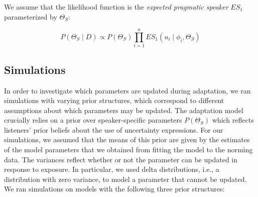 \documentclass[lucida,biblatex]{sp} %
\begin{document}
\noindent We assume that the likelihood function is the \textit{expected pragmatic speaker} $ES_1$ parameterized by $\Theta_S$:

$$P(\Theta_S \mid D) \propto P(\Theta_S)  \prod_{i=1}^n ES_1(u_i \mid \phi_i, \Theta_S) $$



\subsection{Simulations}

In order to investigate which parameters are updated during adaptation, we ran simulations
with varying prior structures, which correspond to different assumptions about which parameters may be updated.
The adaptation model crucially relies on a prior over speaker-specific parameters $P(\Theta_S)$
which reflects listeners' prior beliefs about the use of uncertainty expressions. For our simulations,
we assumed that the means of this prior are given by the estimates of the model parameters that 
we obtained from fitting the model to the norming data. The variances reflect whether or not the parameter can be updated in response to exposure. In particular, we used delta distributions, i.e., a distribution with zero variance, to model a parameter that cannot be updated. We ran simulations on models with the following three prior structures:
\end{document}
